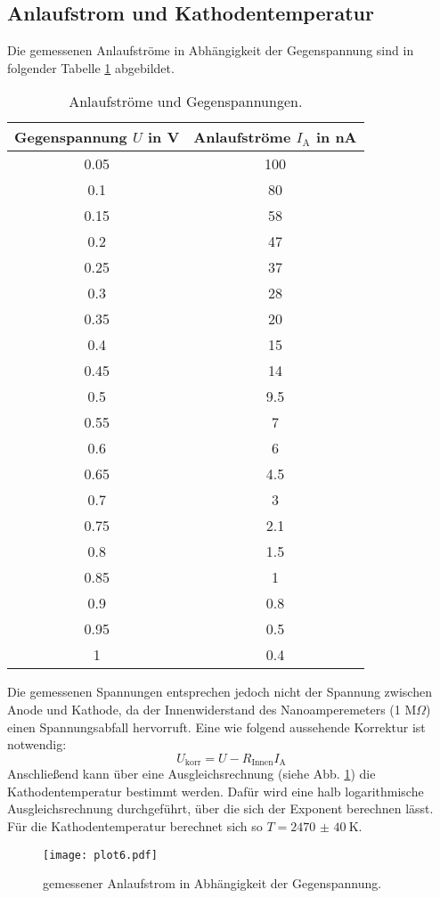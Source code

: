 \subsection{Anlaufstrom und Kathodentemperatur}
\label{sec:anlauf}

Die gemessenen Anlaufströme in Abhängigkeit der Gegenspannung sind in folgender Tabelle \ref{tab:c} abgebildet.
\begin{table}
\centering
\caption{Anlaufströme und Gegenspannungen.}
\label{tab:c}
\begin{tabular}{c c}
\toprule
Gegenspannung $U$ in V & Anlaufströme $I_\text{A}$ in nA \\
\midrule
0.05 & 100 \\
0.1  & 80  \\
0.15 & 58  \\
0.2  & 47  \\
0.25 & 37  \\
0.3  & 28  \\
0.35 & 20  \\
0.4  & 15  \\
0.45 & 14  \\
0.5  & 9.5 \\
0.55 & 7   \\
0.6  & 6   \\
0.65 & 4.5 \\
0.7  & 3   \\
0.75 & 2.1 \\
0.8  & 1.5 \\
0.85 & 1   \\
0.9  & 0.8 \\
0.95 & 0.5 \\
1    & 0.4 \\
\bottomrule
\end{tabular}
\end{table}
Die gemessenen Spannungen entsprechen jedoch nicht der Spannung zwischen Anode und Kathode, da der Innenwiderstand des Nanoamperemeters (1 M$\Omega$) einen Spannungsabfall hervorruft.
Eine wie folgend aussehende Korrektur ist notwendig:
\begin{equation*}
  U_\text{korr} = U - R_\text{Innen} I_\text{A}
\end{equation*}
Anschließend kann über eine Ausgleichsrechnung (siehe Abb. \ref{fig:plot6}) die Kathodentemperatur bestimmt werden.
Dafür wird eine halb logarithmische Ausgleichsrechnung durchgeführt, über die sich der Exponent berechnen lässt.
Für die Kathodentemperatur berechnet sich so $T = \SI{2470(40)}{\kelvin}$.
\begin{figure}
  \centering
  \texttt{[image: plot6.pdf]}
  \caption{gemessener Anlaufstrom in Abhängigkeit der Gegenspannung.}
  \label{fig:plot6}
\end{figure}

